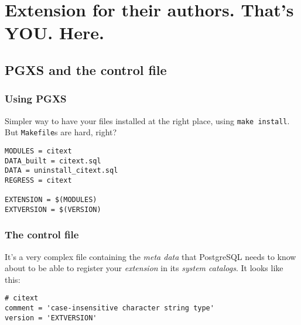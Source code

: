 \documentclass[english]{beamer}
\begin{document}
\section{Extension for their authors. That's YOU. Here.}

\subsection{PGXS and the control file}

\begin{frame}[fragile]
  \frametitle{Using PGXS}

  Simpler way to have your files installed at the right place, using
  \texttt{make install}. But \texttt{Makefile}s are hard, right?
  \linebreak

  \begin{example}
\begin{verbatim}
MODULES = citext
DATA_built = citext.sql
DATA = uninstall_citext.sql
REGRESS = citext

EXTENSION = $(MODULES)
EXTVERSION = $(VERSION)
\end{verbatim}
  \end{example}
\end{frame}


\begin{frame}[fragile]
  \frametitle{The control file}

  It's a very complex file containing the \textit{meta data} that PostgreSQL
  needs to know about to be able to register your \textit{extension} in its
  \textit{system catalogs}. It looks like this:
  \linebreak

  \begin{example}
\begin{verbatim}
# citext
comment = 'case-insensitive character string type'
version = 'EXTVERSION'
\end{verbatim}
  \end{example}
\end{frame}

\end{document}
